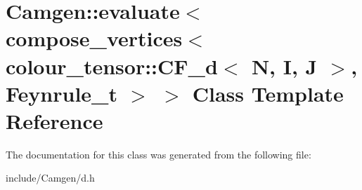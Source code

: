 \hypertarget{a00154}{}\section{Camgen\+:\+:evaluate$<$ compose\+\_\+vertices$<$ colour\+\_\+tensor\+:\+:C\+F\+\_\+d$<$ N, I, J $>$, Feynrule\+\_\+t $>$ $>$ Class Template Reference}
\label{a00154}


The documentation for this class was generated from the following file\+:\begin{DoxyCompactItemize}
\item 
include/\+Camgen/d.\+h\end{DoxyCompactItemize}
